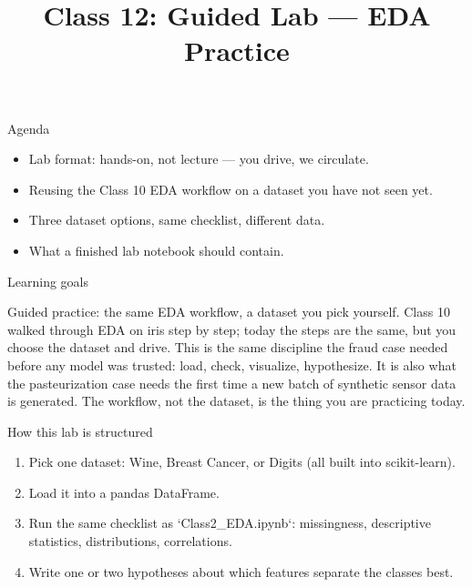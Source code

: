 

\title{Class 12: Guided Lab --- EDA Practice}
\author{\coursename}
\date{}



\frame{\titlepage \coursefooter}

\begin{frame}{Agenda}
\begin{itemize}
\item Lab format: hands-on, not lecture --- you drive, we circulate.
\item Reusing the Class 10 EDA workflow on a dataset you have not seen yet.
\item Three dataset options, same checklist, different data.
\item What a finished lab notebook should contain.
\end{itemize}
\coursefooter
\end{frame}

\begin{frame}{Learning goals}
\coursefooter
\end{frame}

\coursecontextframe
{Guided practice: the same EDA workflow, a dataset you pick yourself.}
{Class 10 walked through EDA on iris step by step; today the steps are the same, but you choose the dataset and drive.}
{This is the same discipline the fraud case needed before any model was trusted: load, check, visualize, hypothesize.}
{It is also what the pasteurization case needs the first time a new batch of synthetic sensor data is generated.}
{The workflow, not the dataset, is the thing you are practicing today.}

\begin{frame}{How this lab is structured}
\begin{enumerate}
\item Pick one dataset: Wine, Breast Cancer, or Digits (all built into scikit-learn).
\item Load it into a pandas DataFrame.
\item Run the same checklist as `Class2\_EDA.ipynb`: missingness, descriptive statistics, distributions, correlations.
\item Write one or two hypotheses about which features separate the classes best.
\end{enumerate}
\coursefooter
\end{frame}

